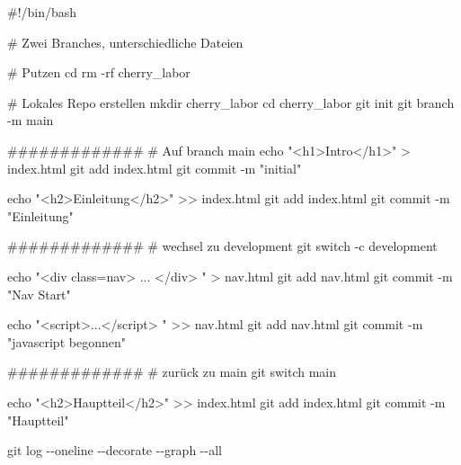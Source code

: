 \documentclass[
  ngerman,
  letterpaper,
  DIV=11]{scrreprt}
\newenvironment{Shaded}{\begin{snugshade}}{\end{snugshade}}
\newcommand{\AttributeTok}[1]{\textcolor[rgb]{0.40,0.45,0.13}{#1}}
\newcommand{\BuiltInTok}[1]{\textcolor[rgb]{0.00,0.23,0.31}{#1}}
\newcommand{\CommentTok}[1]{\textcolor[rgb]{0.37,0.37,0.37}{#1}}
\newcommand{\FunctionTok}[1]{\textcolor[rgb]{0.28,0.35,0.67}{#1}}
\newcommand{\NormalTok}[1]{\textcolor[rgb]{0.00,0.23,0.31}{#1}}
\newcommand{\OperatorTok}[1]{\textcolor[rgb]{0.37,0.37,0.37}{#1}}
\newcommand{\StringTok}[1]{\textcolor[rgb]{0.13,0.47,0.30}{#1}}
\begin{document}
\begin{Shaded}
\begin{Highlighting}[]
\CommentTok{\#!/bin/bash}

\CommentTok{\# Zwei Branches, unterschiedliche Dateien}

\CommentTok{\# Putzen}
\BuiltInTok{cd} 
\FunctionTok{rm} \AttributeTok{{-}rf}\NormalTok{ cherry\_labor}

\CommentTok{\# Lokales Repo erstellen}
\FunctionTok{mkdir}\NormalTok{ cherry\_labor}
\BuiltInTok{cd}\NormalTok{ cherry\_labor}
\FunctionTok{git}\NormalTok{ init}
\FunctionTok{git}\NormalTok{ branch }\AttributeTok{{-}m}\NormalTok{ main}

\CommentTok{\#\#\#\#\#\#\#\#\#\#\#\#\#}
\CommentTok{\# Auf branch main}
\BuiltInTok{echo} \StringTok{"\textless{}h1\textgreater{}Intro\textless{}/h1\textgreater{}"} \OperatorTok{\textgreater{}}\NormalTok{ index.html}
\FunctionTok{git}\NormalTok{ add index.html}
\FunctionTok{git}\NormalTok{ commit }\AttributeTok{{-}m} \StringTok{"initial"}

\BuiltInTok{echo} \StringTok{"\textless{}h2\textgreater{}Einleitung\textless{}/h2\textgreater{}"} \OperatorTok{\textgreater{}\textgreater{}}\NormalTok{ index.html}
\FunctionTok{git}\NormalTok{ add index.html}
\FunctionTok{git}\NormalTok{ commit }\AttributeTok{{-}m} \StringTok{"Einleitung"}

\CommentTok{\#\#\#\#\#\#\#\#\#\#\#\#\#}
\CommentTok{\# wechsel zu development}
\FunctionTok{git}\NormalTok{ switch }\AttributeTok{{-}c}\NormalTok{ development}

\BuiltInTok{echo} \StringTok{"\textless{}div class=\textquotesingle{}nav\textquotesingle{}\textgreater{} ... \textless{}/div\textgreater{} "} \OperatorTok{\textgreater{}}\NormalTok{ nav.html}
\FunctionTok{git}\NormalTok{ add nav.html}
\FunctionTok{git}\NormalTok{ commit }\AttributeTok{{-}m} \StringTok{"Nav Start"}

\BuiltInTok{echo} \StringTok{"\textless{}script\textgreater{}...\textless{}/script\textgreater{} "} \OperatorTok{\textgreater{}\textgreater{}}\NormalTok{ nav.html}
\FunctionTok{git}\NormalTok{ add nav.html}
\FunctionTok{git}\NormalTok{ commit }\AttributeTok{{-}m} \StringTok{"javascript begonnen"}

\CommentTok{\#\#\#\#\#\#\#\#\#\#\#\#\#}
\CommentTok{\# zurück zu main}
\FunctionTok{git}\NormalTok{ switch main}

\BuiltInTok{echo} \StringTok{"\textless{}h2\textgreater{}Hauptteil\textless{}/h2\textgreater{}"} \OperatorTok{\textgreater{}\textgreater{}}\NormalTok{ index.html}
\FunctionTok{git}\NormalTok{ add index.html}
\FunctionTok{git}\NormalTok{ commit }\AttributeTok{{-}m} \StringTok{"Hauptteil"}

\FunctionTok{git}\NormalTok{ log }\AttributeTok{{-}{-}oneline} \AttributeTok{{-}{-}decorate} \AttributeTok{{-}{-}graph} \AttributeTok{{-}{-}all}
\end{Highlighting}
\end{Shaded}
\end{document}
